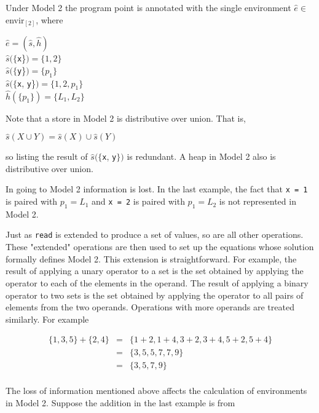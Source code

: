 \noindent
Under Model 2 the program point is annotated with the single
environment $\hat{e} {\in}$ envir$_{[2]}$, where

\goodbreak
\begin{iconcode}
\> $\hat{e} = (\hat{s},\hat{h})$\\
\> $\hat{s}(\{$\texttt{x}\}$) = \{1,2\}$\\
\> $\hat{s}(\{$\texttt{y}\}$) = \{p_1\}$\\
\> $\hat{s}(\{$\texttt{x}, \texttt{y}\}$) = \{1, 2, p_1\}$\\
\> $\hat{h}(\{p_1\}) = \{L_1, L_2\}$\\
\end{iconcode}

\noindent
Note that a store in Model 2 is distributive over union. That is, 


$\hat{s}(X \cup Y) = \hat{s}(X) \cup \hat{s}(Y)$

\noindent
so listing the result of $\hat{s}(\{$\texttt{x}, \texttt{y}$\})$ is
redundant. A heap in Model 2 also is distributive over union.

In going to Model 2 information is lost. In the last example, the fact
that \texttt{x = 1} is paired with $p_1 =L_1$ and \texttt{x = 2} is
paired with $p_1 = L_2$ is not represented in Model 2.

Just as \texttt{read} is extended to produce a set of values, so are
all other operations. These "extended" operations are then used to set
up the equations whose solution formally defines Model 2. This
extension is straightforward. For example, the result of applying a
unary operator to a set is the set obtained by applying the operator
to each of the elements in the operand. The result of applying a
binary operator to two sets is the set obtained by applying the
operator to all pairs of elements from the two operands. Operations
with more operands are treated similarly. For example

\begin{eqnarray*}
\{1, 3, 5\} + \{2, 4\} & = & \{1 + 2, 1 + 4, 3 + 2, 3 + 4, 5 + 2, 5 + 4\}\\
                       & = & \{3, 5, 5, 7, 7, 9\}\\
                       & = & \{3, 5, 7, 9\}\\
\end{eqnarray*}

The loss of information mentioned above affects the calculation of
environments in Model 2. Suppose the addition in the last example is
from

